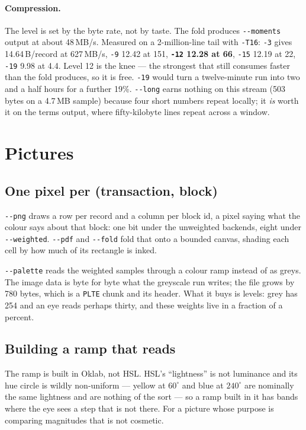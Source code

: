 \documentclass[11pt,a4paper]{article}
\newcommand{\flag}[1]{\texttt{-{}-#1}}
\begin{document}
\paragraph{Compression.} The level is set by the byte rate, not by taste. The
fold produces \flag{moments} output at about 48\,MB/s. Measured on a
2-million-line tail with \texttt{-T16}: \texttt{-3} gives 14.64\,B/record at
627\,MB/s, \texttt{-9} 12.42 at 151, \textbf{\texttt{-12} 12.28 at 66},
\texttt{-15} 12.19 at 22, \texttt{-19} 9.98 at 4.4. Level 12 is the knee --- the
strongest that still consumes faster than the fold produces, so it is free.
\texttt{-19} would turn a twelve-minute run into two and a half hours for a
further 19\%. \texttt{-{}-long} earns nothing on this stream (503 bytes on a
4.7\,MB sample) because four short numbers repeat locally; it \emph{is} worth it
on the terms output, where fifty-kilobyte lines repeat across a window.

\section{Pictures}
\label{sec:pictures}

\subsection{One pixel per (transaction, block)}

\flag{png} draws a row per record and a column per block id, a pixel saying what
the colour says about that block: one bit under the unweighted backends, eight
under \flag{weighted}. \flag{pdf} and \flag{fold} fold that onto a bounded
canvas, shading each cell by how much of its rectangle is inked.

\flag{palette} reads the weighted samples through a colour ramp instead of as
greys. The image data is byte for byte what the greyscale run writes; the file
grows by 780 bytes, which is a \texttt{PLTE} chunk and its header. What it buys
is levels: grey has 254 and an eye reads perhaps thirty, and these weights live
in a fraction of a percent.

\subsection{Building a ramp that reads}

The ramp is built in Oklab, not HSL. HSL's ``lightness'' is not luminance and
its hue circle is wildly non-uniform --- yellow at $60^\circ$ and blue at
$240^\circ$ are nominally the same lightness and are nothing of the sort --- so a
ramp built in it has bands where the eye sees a step that is not there. For a
picture whose purpose is comparing magnitudes that is not cosmetic.
\end{document}
